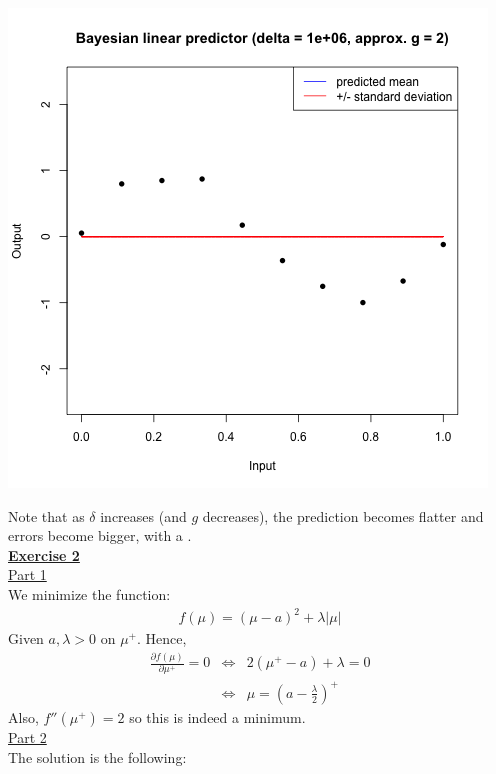 \documentclass[a4paper, 11pt]{article}
\begin{document}
\begin{center}
\includegraphics[scale=0.6]{ps3F_plot13.png}
\end{center}
Note that as $\delta$ increases (and $g$ decreases), the prediction becomes flatter and errors become bigger, with a .\\
\newpage
\textbf{\underline{Exercise 2}}\\
\newline \underline{Part 1}\\
\newline We minimize the function:
\begin{eqnarray}
f(\mu) = (\mu - a)^2 + \lambda |\mu| \nonumber
\end{eqnarray}
Given $a, \lambda > 0$ on $\mu^+$. Hence,
\begin{eqnarray}
\frac{\partial f(\mu)}{\partial \mu^+} = 0 &\Leftrightarrow& 2(\mu^+ -a) + \lambda = 0 \nonumber \\
&\Leftrightarrow& \mu = \left( a - \frac{\lambda}{2} \right)^+ \nonumber
\end{eqnarray}
Also, $f''(\mu^+) = 2$ so this is indeed a minimum.\\
\newline \underline{Part 2}\\
\newline The solution is the following:
\end{document}
